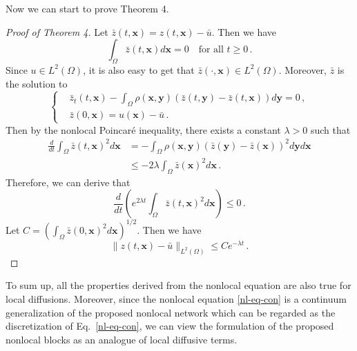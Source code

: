 \documentclass{article}
\newcommand{\xb}{\bm{x}}
\newcommand{\yb}{\bm{y}}
\begin{document}
Now we can start to prove Theorem 4.
\begin{proof}[Proof of Theorem 4]
Let $\bar{z}(t,\xb)=z(t,\xb)-\bar{u}$. Then we have
\[
\int_\Omega \bar{z}(t,\xb)d\xb=0\quad \text{for all } t\ge 0\,.
\]
Since $u\in L^2(\Omega)$, it is also easy to get that $\bar{z}(\cdot,\xb)\in L^2(\Omega)$. Moreover, $\bar{z}$ is the solution to
\[
\left\{
\begin{aligned}
&\bar{z}_t(t,\xb)-\int_\Omega \rho(\xb,\yb)(\bar{z}(t,\yb)-\bar{z}(t,\xb))d\yb=0\,,\\
& \bar{z}(0,\xb)=u(\xb)-\bar{u}\,.
\end{aligned}
\right.
\]
Then by the nonlocal Poincar\'e inequality, there exists a constant $\lambda>0$ such that
\[
\begin{aligned}
\frac{d}{dt} \int_\Omega \bar{z}(t,\xb)^2d\xb &= -\int_\Omega \rho(\xb,\yb)(\bar{z}(\yb)-\bar{z}(\xb))^2d\yb d\xb \\
& \le -2\lambda \int_\Omega \bar{z}(\xb)^2d\xb\,.
\end{aligned}
\]
Therefore, we can derive that
\[
\frac{d}{dt} \left( e^{2\lambda t}\int_\Omega \bar{z}(t,\xb)^2d\xb\right) \le 0\,.
\]
Let $C=\left(\int_\Omega \bar{z}(0,\xb)^2d\xb\right)^{1/2}$. Then we have
\[
\|z(t,\xb)-\bar{u}\|_{L^2(\Omega)} \le Ce^{-\lambda t}\,.
\]
\end{proof}

To sum up, all the properties derived from the nonlocal equation are also true for local diffusions. Moreover, since the nonlocal equation \eqref{nl-eq-con} is a continuum generalization of the proposed nonlocal network which can be regarded as the discretization of Eq.~\eqref{nl-eq-con}, we can view the formulation of the proposed nonlocal blocks as an analogue of local diffusive terms.
\end{document}
